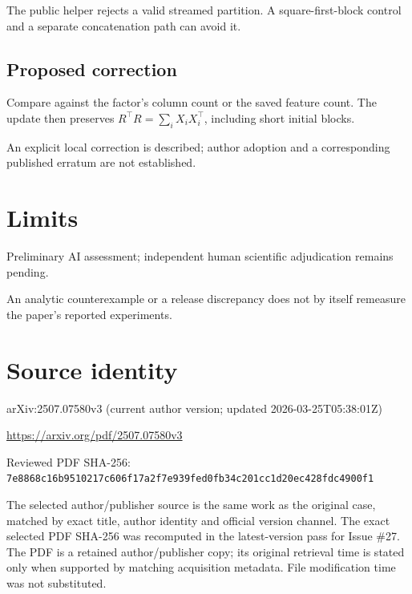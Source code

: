 \documentclass[11pt]{article}
\begin{document}
The public helper rejects a valid streamed partition. A square-first-block control and a separate concatenation path can avoid it.

\subsection*{Proposed correction}

Compare against the factor’s column count or the saved feature count. The update then preserves \(R^\top R=\sum_iX_iX_i^\top\), including short initial blocks.

An explicit local correction is described; author adoption and a corresponding published erratum are not established.

\section*{Limits}

Preliminary AI assessment; independent human scientific adjudication remains pending.\par

An analytic counterexample or a release discrepancy does not by itself remeasure the paper’s reported experiments.\par

\section*{Source identity}

arXiv:2507.07580v3 (current author version; updated 2026-03-25T05:38:01Z)

\url{https://arxiv.org/pdf/2507.07580v3}

Reviewed PDF SHA-256: \nolinkurl{7e8868c16b9510217c606f17a2f7e939fed0fb34c201cc1d20ec428fdc4900f1}

The selected author/publisher source is the same work as the original case, matched by exact title, author identity and official version channel. The exact selected PDF SHA-256 was recomputed in the latest-version pass for Issue \#27. The PDF is a retained author/publisher copy; its original retrieval time is stated only when supported by matching acquisition metadata. File modification time was not substituted.
\end{document}
